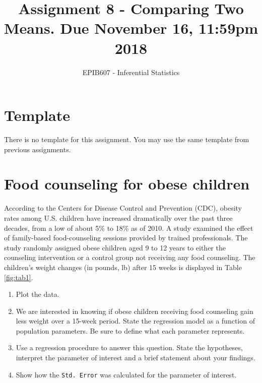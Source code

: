 \documentclass[letterpaper,9pt,twoside,printwatermark=false]{pinp}
\title{Assignment 8 - Comparing Two Means. Due November 16, 11:59pm 2018}
\author[a]{EPIB607 - Inferential Statistics}
\affil[a]{Fall 2018, McGill University}
\providecommand{\tightlist}{%
  \setlength{\itemsep}{0pt}\setlength{\parskip}{0pt}}
\begin{document}
\verticaladjustment{-2pt}

\maketitle
\thispagestyle{firststyle}



\section*{Template}\label{template}

There is no template for this assignment. You may use the same template
from previous assignments.

\section{Food counseling for obese
children}\label{food-counseling-for-obese-children}

According to the Centers for Disease Control and Prevention (CDC),
obesity rates among U.S. children have increased dramatically over the
past three decades, from a low of about 5\% to 18\% as of 2010. A study
examined the effect of family-based food-counseling sessions provided by
trained professionals. The study randomly assigned obese children aged 9
to 12 years to either the counseling intervention or a control group not
receiving any food counseling. The children's weight changes (in pounds,
lb) after 15 weeks is displayed in Table \ref{fig:tab1}.

\begin{enumerate}
\def\labelenumi{\alph{enumi}.}
\tightlist
\item
  Plot the data.
\item
  We are interested in knowing if obese children receiving food
  counseling gain less weight over a 15-week period. State the
  regression model as a function of population parameters. Be sure to
  define what each parameter represents.
\item
  Use a regression procedure to answer this question. State the
  hypotheses, interpret the parameter of interest and a brief statement
  about your findings.
\item
  Show how the \texttt{Std. Error} was calculated for the parameter of
  interest.
\end{enumerate}
\end{document}

